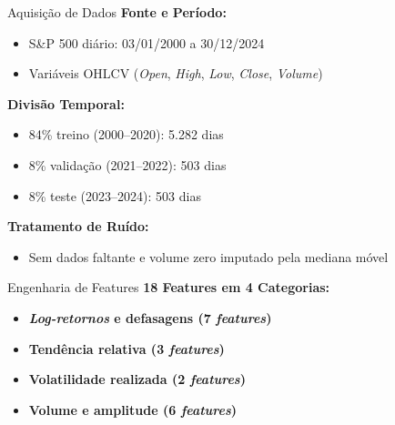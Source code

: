 \documentclass[10pt]{beamer}
\begin{document}
\begin{frame}{Aquisição de Dados}
\textbf{Fonte e Período:}
\begin{itemize}
    \item S\&P 500 diário: 03/01/2000 a 30/12/2024
    \item Variáveis OHLCV (\textit{Open}, \textit{High}, \textit{Low}, \textit{Close}, \textit{Volume})
\end{itemize}

\vspace{0.3cm}
\textbf{Divisão Temporal:}
\begin{itemize}
    \item 84\% treino (2000--2020): 5.282 dias
    \item 8\% validação (2021--2022): 503 dias
    \item 8\% teste (2023--2024): 503 dias
\end{itemize}

\vspace{0.3cm}
\textbf{Tratamento de Ruído:}
\begin{itemize}
    \item Sem dados faltante e volume zero imputado pela mediana móvel
\end{itemize}
\end{frame}

\begin{frame}{Engenharia de Features}
\textbf{18 Features em 4 Categorias:}
\begin{itemize}
    \item \textbf{\textit{Log-retornos} e defasagens (7 \textit{features})}
    \item \textbf{Tendência relativa (3 \textit{features})}
    \item \textbf{Volatilidade realizada (2 \textit{features})}
    \item \textbf{Volume e amplitude (6 \textit{features})}
\end{itemize}
\end{frame}
\end{document}

